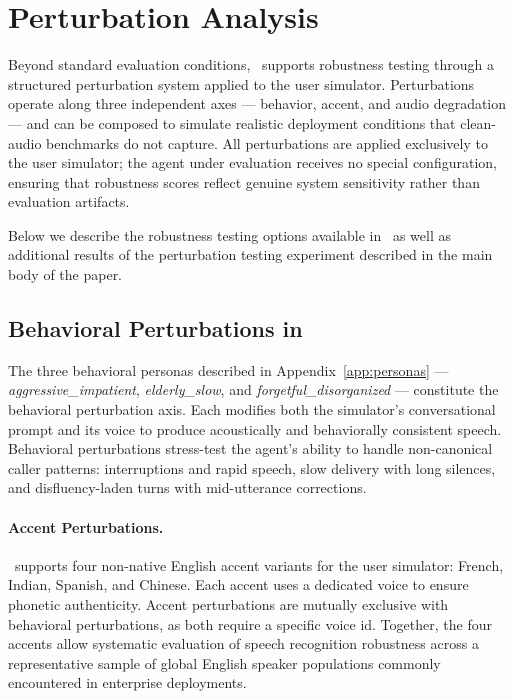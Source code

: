 \clearpage
\section{Perturbation Analysis}
\label{app:perturbations}

Beyond standard evaluation conditions, \framework~supports robustness testing through a structured perturbation system applied to the user simulator. Perturbations operate along three independent axes — behavior, accent, and audio degradation — and can be composed to simulate realistic deployment conditions that clean-audio benchmarks do not capture. All perturbations are applied exclusively to the user simulator; the agent under evaluation receives no special configuration, ensuring that robustness scores reflect genuine system sensitivity rather than evaluation artifacts.

Below we describe the robustness testing options available in \framework~as well as additional results of the perturbation testing experiment described in the main body of the paper.

\subsection{Behavioral Perturbations in \framework}
The three behavioral personas described in Appendix~\ref{app:personas} — \textit{aggressive\_impatient}, \textit{elderly\_slow}, and \textit{forgetful\_disorganized} — constitute the behavioral perturbation axis. Each modifies both the simulator's conversational prompt and its voice to produce acoustically and behaviorally consistent speech. Behavioral perturbations stress-test the agent's ability to handle non-canonical caller patterns: interruptions and rapid speech, slow delivery with long silences, and disfluency-laden turns with mid-utterance corrections.

\paragraph{Accent Perturbations.}
\framework~supports four non-native English accent variants for the user simulator: French, Indian, Spanish, and Chinese. Each accent uses a dedicated voice to ensure phonetic authenticity. Accent perturbations are mutually exclusive with behavioral perturbations, as both require a specific voice id. Together, the four accents allow systematic evaluation of speech recognition robustness across a representative sample of global English speaker populations commonly encountered in enterprise deployments.

